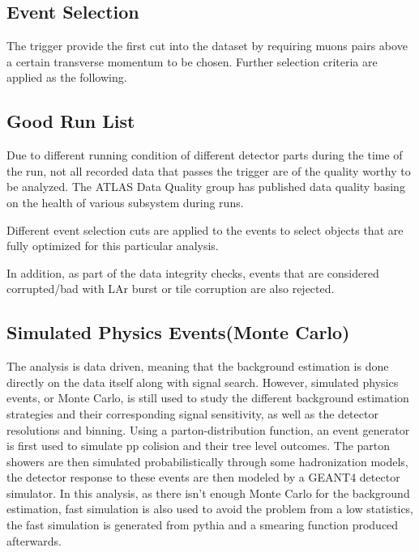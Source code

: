 

\subsection{Event Selection}
The trigger provide the first cut into the dataset by requiring muons pairs above a certain transverse momentum to be chosen. Further selection criteria are applied as the following. 

\subsection*{Good Run List}
Due to different running condition of different detector parts during the time of the run, not all recorded data that passes the trigger are of the quality worthy to be analyzed. The ATLAS Data Quality group has published data quality basing on the health of various subsystem during runs. 

Different event selection cuts are applied to the events to select objects that are fully optimized for this particular analysis.  

In addition, as part of the data integrity checks, events that are considered corrupted/bad with LAr burst or tile corruption are also rejected. 





\subsection{Simulated Physics Events(Monte Carlo)}
The analysis is data driven, meaning that the background estimation is done directly on the data itself along with signal search. However, simulated physics events, or Monte Carlo, is still used to study the different background estimation strategies and their corresponding signal sensitivity, as well as the detector resolutions and binning. 
Using a parton-distribution function, an event generator is first used to simulate pp colision and their tree level outcomes. The parton showers are then simulated probabilistically through some hadronization models, the detector response to these events are then modeled by a GEANT4 detector simulator. 
In this analysis, as there isn't enough Monte Carlo for the background estimation, fast simulation is also used to avoid the problem from a low statistics, the fast simulation is generated from pythia and a smearing function produced afterwards. 

